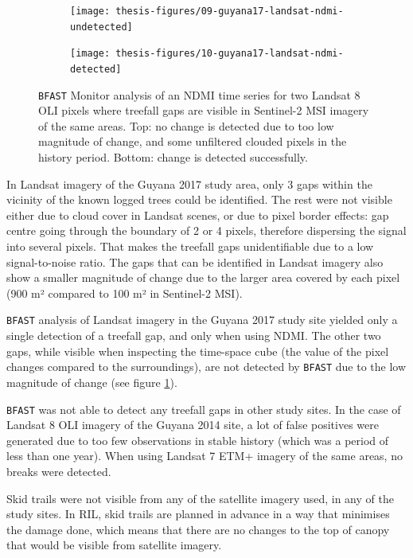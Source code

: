 \documentclass[a4paper,12pt]{scrbook}
\begin{document}
\begin{figure}
  \begin{subfigure}{\textwidth}
    \centering
    \texttt{[image: thesis-figures/09-guyana17-landsat-ndmi-undetected]}
  \end{subfigure}
  \begin{subfigure}{\textwidth}
    \centering
    \texttt{[image: thesis-figures/10-guyana17-landsat-ndmi-detected]}
  \end{subfigure}
  
  \caption{\texttt{BFAST} Monitor analysis of an \ac{NDMI} time series for two Landsat 8 \ac{OLI} pixels where treefall gaps are visible in Sentinel-2 \ac{MSI} imagery of the same areas. Top: no change is detected due to too low magnitude of change, and some unfiltered clouded pixels in the history period. Bottom: change is detected successfully.}
  \label{fig-guyana17-landsat-ndmi}
\end{figure}

In Landsat imagery of the Guyana 2017 study area, only 3 gaps within the vicinity of the known logged trees could be identified. The rest were not visible either due to cloud cover in Landsat scenes, or due to pixel border effects: gap centre going through the boundary of 2 or 4 pixels, therefore dispersing the signal into several pixels. That makes the treefall gaps unidentifiable due to a low signal-to-noise ratio. The gaps that can be identified in Landsat imagery also show a smaller magnitude of change due to the larger area covered by each pixel (900 m² compared to 100 m² in Sentinel-2 \ac{MSI}).

\texttt{BFAST} analysis of Landsat imagery in the Guyana 2017 study site yielded only a single detection of a treefall gap, and only when using \ac{NDMI}. The other two gaps, while visible when inspecting the time-space cube (the value of the pixel changes compared to the surroundings), are not detected by \texttt{BFAST} due to the low magnitude of change (see figure \ref{fig-guyana17-landsat-ndmi}).

\texttt{BFAST} was not able to detect any treefall gaps in other study sites. In the case of Landsat 8 \ac{OLI} imagery of the Guyana 2014 site, a lot of false positives were generated due to too few observations in stable history (which was a period of less than one year). When using Landsat 7 \ac{ETM+} imagery of the same areas, no breaks were detected.

Skid trails were not visible from any of the satellite imagery used, in any of the study sites. In \ac{RIL}, skid trails are planned in advance in a way that minimises the damage done, which means that there are no changes to the top of canopy that would be visible from satellite imagery.
\end{document}
